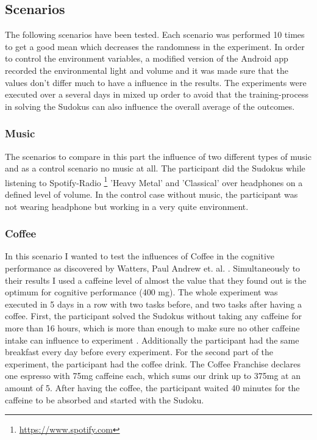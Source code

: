{\subsection{Scenarios}
The following scenarios have been tested. Each scenario was performed 10 times to get a good mean which decreases the randomness in the experiment. In order to control the environment variables, a modified version of the Android app recorded the environmental light and volume and it was made sure that the values don't differ much to have a influence in the results. 
The experiments were executed over a several days in mixed up order to avoid that the training-process in solving the Sudokus can also influence the overall average of the outcomes.

\subsubsection{Music}
The scenarios to compare in this part the influence of two different types of music and as a control scenario no music at all. The participant did the Sudokus while listening to Spotify-Radio \footnote{\url{https://www.spotify.com}} 'Heavy Metal' and 'Classical' over headphones on a defined level of volume. In the control case without music, the participant was not wearing headphone but working in a very quite environment.

\subsubsection{Coffee}
In this scenario I wanted to test the influences of Coffee in the cognitive performance as discovered by Watters, Paul Andrew et. al. \cite{watters1997caffeine}. Simultaneously to their results I used a caffeine level of almost the value that they found out is the optimum for cognitive performance (400 mg). 
The whole experiment was executed in 5 days in a row with two tasks before, and two tasks after having a coffee. 
First, the participant solved the Sudokus without taking any caffeine for more than 16 hours, which is more than enough to make sure no other caffeine intake can influence to experiment \cite{liguori1997absorption}. Additionally the participant had the same breakfast every day before every experiment. 
For the second part of the experiment, the participant had the coffee drink. The Coffee Franchise declares one espresso with 75mg caffeine each, which sums our drink up to 375mg at an amount of 5. After having the coffee, the participant waited 40 minutes for the caffeine to be absorbed \cite{liguori1997absorption} and started with the Sudoku. 

}

